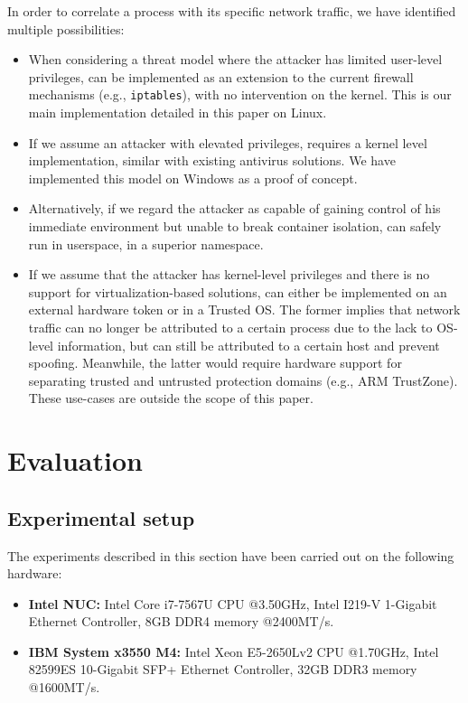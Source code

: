 In order to correlate a process with its specific network traffic, we have identified multiple possibilities:
\begin{itemize}
    \item When considering a threat model where the attacker has limited user-level privileges, \daf{} can be implemented as an extension to the current firewall mechanisms (e.g., \texttt{iptables}), with no intervention on the kernel. This is our main implementation detailed in this paper on Linux.
    \item If we assume an attacker with elevated privileges, \daf{} requires a kernel level implementation, similar with existing antivirus solutions. We have implemented this model on Windows as a proof of concept.
    \item Alternatively, if we regard the attacker as capable of gaining control of his immediate environment but unable to break container isolation, \daf{} can safely run in userspace, in a superior namespace.
    \item If we assume that the attacker has kernel-level privileges and there is no support for virtualization-based solutions, \daf{} can either be implemented on an external hardware token or in a Trusted OS. The former implies that network traffic can no longer be attributed to a certain process due to the lack to OS-level information, but can still be attributed to a certain host and prevent spoofing. Meanwhile, the latter would require hardware support for separating trusted and untrusted protection domains (e.g., ARM TrustZone). These use-cases are outside the scope of this paper.
\end{itemize}

\section{Evaluation}

\subsection{Experimental setup}

The experiments described in this section have been carried out on the following hardware:

\begin{itemize}
    \item \textbf{Intel NUC:} Intel Core i7-7567U CPU @3.50GHz, Intel I219-V 1-Gigabit Ethernet Controller, 8GB DDR4 memory @2400MT/s.
    \item \textbf{IBM System x3550 M4:} Intel Xeon E5-2650Lv2 CPU @1.70GHz, Intel 82599ES 10-Gigabit SFP+ Ethernet Controller, 32GB DDR3 memory @1600MT/s.
\end{itemize}

